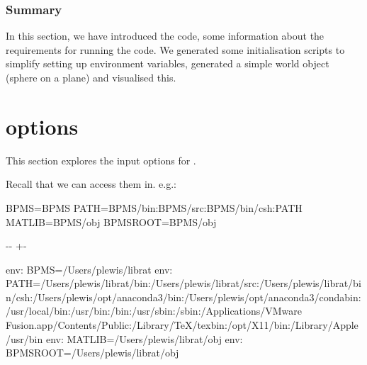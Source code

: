 \documentclass[letterpaper,10pt,english]{sphinxmanual}
\newlength\nbsphinxcodecellspacing
\begin{document}
\subsection{Summary}
\label{\detokenize{RATstart:Summary}}
In this section, we have introduced the  code, some information about the requirements for running the code. We generated some initialisation scripts to simplify setting up environment variables, generated a simple world object (sphere on a plane) and visualised this.


\chapter{ options}
\label{\detokenize{RATstartOptions:RATstart-options}}\label{\detokenize{RATstartOptions::doc}}
This section explores the input options for .

Recall that we can access them in. e.g.:

{
\begin{sphinxVerbatim}[commandchars=\\\{\}]
\llap{\color{nbsphinxin}[2]:\,\hspace{\fboxrule}\hspace{\fboxsep}} 
   
 BPMS=\PYGZdl{}BPMS
 PATH=\PYGZdl{}BPMS/bin:\PYGZdl{}BPMS/src:\PYGZdl{}BPMS/bin/csh:\PYGZdl{}PATH\PYGZus{}
 MATLIB=\PYGZdl{}BPMS/obj
 BPMSROOT=\PYGZdl{}BPMS/obj
\end{sphinxVerbatim}
}

{

\kern-\sphinxverbatimsmallskipamount\kern-\baselineskip
\kern+\FrameHeightAdjust\kern-\fboxrule
\vspace{\nbsphinxcodecellspacing}

\begin{sphinxVerbatim}[commandchars=\\\{\}]
env: BPMS=/Users/plewis/librat
env: PATH=/Users/plewis/librat/bin:/Users/plewis/librat/src:/Users/plewis/librat/bin/csh:/Users/plewis/opt/anaconda3/bin:/Users/plewis/opt/anaconda3/condabin:/usr/local/bin:/usr/bin:/bin:/usr/sbin:/sbin:/Applications/VMware Fusion.app/Contents/Public:/Library/TeX/texbin:/opt/X11/bin:/Library/Apple/usr/bin
env: MATLIB=/Users/plewis/librat/obj
env: BPMSROOT=/Users/plewis/librat/obj
\end{sphinxVerbatim}
}
\end{document}
